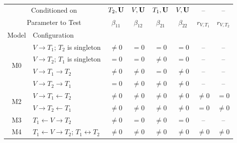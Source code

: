 \documentclass[12pt,letterpaper]{report}
\newcommand{\betaoneone}{\beta_{11}}
\newcommand{\betaonetwo}{\beta_{12}}
\newcommand{\betatwoone}{\beta_{21}}
\newcommand{\betatwotwo}{\beta_{22}}
\begin{document}
\begin{doublespace}
\begin{table}[H]
\begin{tabular}{c|p{2.8cm}|cccc|cc}
		\multicolumn{2}{c|}{Conditioned on} 
		& \small $T_2, {\bf U}$
		& \small $V, {\bf U}$
		& \small $T_1, {\bf U}$
		& \small $V, {\bf U}$
		& \small -- 
		& \small --    \\
		
		\multicolumn{2}{c|}{Parameter to Test} & $\betaoneone$ & $\betaonetwo$ & $\betatwoone$ & $\betatwotwo$ & $r_{V, T_1}$ &  $r_{V, T_2}$  \\
		\midrule
		
		Model & Configuration & \multicolumn{4}{c|}{} & \multicolumn{2}{c}{} \\ 
		\midrule[0.04cm]
		
		\multirow{4}{*}{M0} & \small $V \rightarrow T_1$; $T_2$ is singleton & $\neq 0$ & $= 0$ & $=0$ & $=0$ & -- &  --  \\ 
		
		& \small $V \rightarrow T_2$; $T_1$ is singleton &  $= 0$ & $= 0$ & $\neq 0$ & $= 0$ & -- & -- \\ 
		\midrule
		
		\multirow{2}{*}{M1} \small & $V \rightarrow T_1 \rightarrow T_2$ & $\neq 0$ & $\neq 0$ & $= 0$ & $\neq 0$ & -- & -- \\  
		
		& \small $V \rightarrow T_2 \rightarrow T_1$ & $ = 0$ & $\neq0$ & $\neq0$ & $\neq 0$ & -- & -- \\ 
		\midrule
		
		\multirow{2}{*}{M2} & $V\rightarrow T_1 \leftarrow T_2$ & $\neq0$ & $\neq 0$ & $\neq0$ & $\neq0$ & $\neq0$ & $=0$ \\ 
		
		& \small $V\rightarrow T_2 \leftarrow T_1$ & $\neq0$ & $\neq 0$ & $\neq0$ & $\neq0$ & $=0$ & $\neq 0$ \\  
		\midrule
		\multirow{1}{*}{M3} & \small $T_1 \leftarrow V \rightarrow T_2$ & $\neq 0$ & $= 0$ & $\neq0$ & $=0$ & -- & -- \\  
		\midrule
		\multirow{2}{*}{M4} & \small $T_1 \leftarrow V \rightarrow T_2$; $T_1 \longleftrightarrow T_2$ & $\neq0$ & $\neq 0$ & $\neq0$ & $\neq0$ & $\neq 0$ & $\neq 0$ \\  
		\bottomrule[0.04cm]
	\end{tabular}
	\label{tab:tests}
\end{table}



\end{doublespace}
\end{document}
